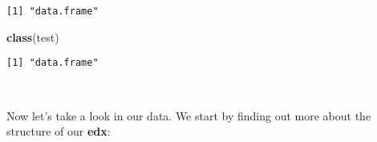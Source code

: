 \documentclass[
  10pt,
  a4paper]{article}
\newenvironment{Shaded}{\begin{snugshade}}{\end{snugshade}}
\newcommand{\DecValTok}[1]{\textcolor[rgb]{0.00,0.00,0.81}{#1}}
\newcommand{\KeywordTok}[1]{\textcolor[rgb]{0.13,0.29,0.53}{\textbf{#1}}}
\newcommand{\NormalTok}[1]{#1}
\newcommand{\OperatorTok}[1]{\textcolor[rgb]{0.81,0.36,0.00}{\textbf{#1}}}
\begin{document}
\begin{verbatim}
[1] "data.frame"
\end{verbatim}

\begin{Shaded}
\begin{Highlighting}[]
\KeywordTok{class}\NormalTok{(test)}
\end{Highlighting}
\end{Shaded}

\begin{verbatim}
[1] "data.frame"
\end{verbatim}

~

Now let's take a look in our data. We start by finding out more about
the structure of our \textbf{edx}:

~

\begin{Shaded}
\end{Shaded}
\end{document}
